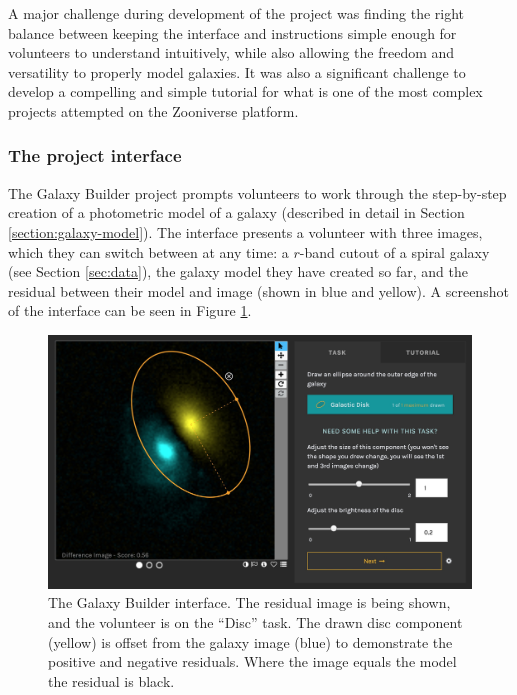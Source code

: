 \documentclass[../main.tex]{subfiles}
\begin{document}
A major challenge during development of the project was finding the right balance between keeping the interface and instructions simple enough for volunteers to understand intuitively, while also allowing the freedom and versatility to properly model galaxies. It was also a significant challenge to develop a compelling and simple tutorial for what is one of the most complex projects attempted on the Zooniverse platform.

\subsubsection{The project interface}

The Galaxy Builder project prompts volunteers to work through the step-by-step creation of a photometric model of a galaxy (described in detail in Section \ref{section:galaxy-model}). The interface presents a volunteer with three images, which they can switch between at any time: a $r$-band cutout of a spiral galaxy (see Section \ref{sec:data}), the galaxy model they have created so far, and the residual between their model and image (shown in blue and yellow). A screenshot of the interface can be seen in Figure \ref{fig:interfaceInProgress}.

\begin{figure}
  \includegraphics[width=17.7cm]{images/interfaceInProgress.jpg}
  \caption{The Galaxy Builder interface. The residual image is being shown, and the volunteer is on the ``Disc'' task. The drawn disc component (yellow) is offset from the galaxy image (blue) to demonstrate the positive and negative residuals. Where the image equals the model the residual is black.}
  \label{fig:interfaceInProgress}
\end{figure}
\end{document}
